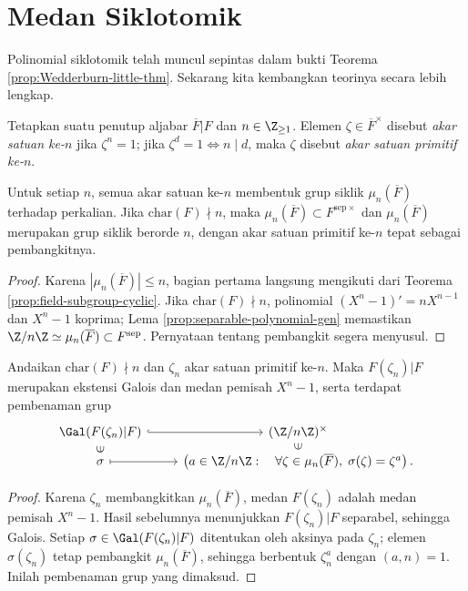 \section{Medan Siklotomik}\label{sec:cyclotomic-ext}
Polinomial siklotomik telah muncul sepintas dalam bukti Teorema \ref{prop:Wedderburn-little-thm}. Sekarang kita kembangkan teorinya secara lebih lengkap.

\begin{definition}
	Tetapkan suatu penutup aljabar $\overline{F}|F$ dan $n \in \Z_{\geq 1}$. Elemen $\zeta \in \overline{F}^\times$ disebut \emph{akar satuan ke-$n$} jika $\zeta^n=1$; jika $\zeta^d=1 \iff n \mid d$, maka $\zeta$ disebut \emph{akar satuan primitif ke-$n$}.
\end{definition}

\begin{proposition}
	Untuk setiap $n$, semua akar satuan ke-$n$ membentuk grup siklik $\mu_n(\overline{F})$ terhadap perkalian. Jika $\mathrm{char}(F)\nmid n$, maka $\mu_n(\overline{F})\subset F^{\mathrm{sep}\times}$ dan $\mu_n(\overline{F})$ merupakan grup siklik berorde $n$, dengan akar satuan primitif ke-$n$ tepat sebagai pembangkitnya.
\end{proposition}
\begin{proof}
	Karena $|\mu_n(\overline{F})|\leq n$, bagian pertama langsung mengikuti dari Teorema \ref{prop:field-subgroup-cyclic}. Jika $\text{char}(F)\nmid n$, polinomial $(X^n-1)'=nX^{n-1}$ dan $X^n-1$ koprima; Lema \ref{prop:separable-polynomial-gen} memastikan $\Z/n\Z\simeq\mu_n(\overline{F})\subset F^\text{sep}$. Pernyataan tentang pembangkit segera menyusul.
\end{proof}

\begin{proposition}\label{prop:cyclotomic-ext-general}
	Andaikan $\mathrm{char}(F)\nmid n$ dan $\zeta_n$ akar satuan primitif ke-$n$. Maka $F(\zeta_n)|F$ merupakan ekstensi Galois dan medan pemisah $X^n-1$, serta terdapat pembenaman grup
	\begin{equation}\label{eqn:cyclotomic-ext-general}\begin{tikzcd}[row sep=tiny]
		\Gal(F(\zeta_n)|F) \arrow[hookrightarrow, r] & (\Z/n\Z)^\times \\
		\sigma \arrow[mapsto, r] \arrow[phantom, u, sloped, "\in" description] & \left( a \in \Z/n\Z: \quad \forall \zeta \in \mu_n(\overline{F}), \; \sigma(\zeta) = \zeta^a \right).  \arrow[phantom, u, sloped, "\in" description]
	\end{tikzcd}\end{equation}
\end{proposition}
\begin{proof}
	Karena $\zeta_n$ membangkitkan $\mu_n(\overline{F})$, medan $F(\zeta_n)$ adalah medan pemisah $X^n-1$. Hasil sebelumnya menunjukkan $F(\zeta_n)|F$ separabel, sehingga Galois. Setiap $\sigma\in\Gal(F(\zeta_n)|F)$ ditentukan oleh aksinya pada $\zeta_n$; elemen $\sigma(\zeta_n)$ tetap pembangkit $\mu_n(\overline{F})$, sehingga berbentuk $\zeta_n^a$ dengan $(a,n)=1$. Inilah pembenaman grup yang dimaksud.
\end{proof}

